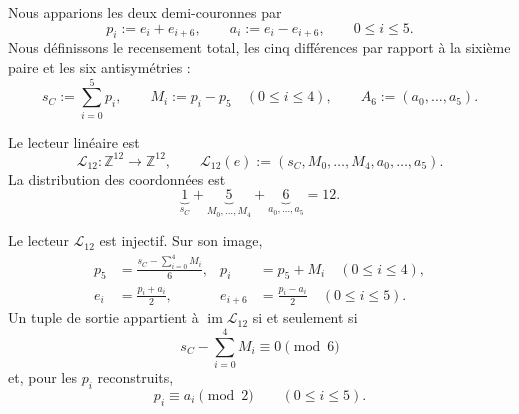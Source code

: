 Nous apparions les deux demi-couronnes par
\begin{equation}
 p_i:=e_i+e_{i+6},
 \qquad
 a_i:=e_i-e_{i+6},
 \qquad 0\leq i\leq5.
 \label{eq:u006d-pares-antipodales}
\end{equation}
Nous définissons le recensement total, les cinq différences par rapport à la sixième paire et
les six antisymétries :
\begin{equation}
 s_C:=\sum_{i=0}^{5}p_i,
 \qquad
 M_i:=p_i-p_5\quad(0\leq i\leq4),
 \qquad
 A_6:=(a_0,\ldots,a_5).
 \label{eq:u006d-coordenadas-uno-cinco-seis}
\end{equation}

\begin{definition}
\label{def:u006d-lector-integral}
Le lecteur linéaire est
\begin{equation}
 \mathcal L_{12}:\mathbb Z^{12}\longrightarrow\mathbb Z^{12},
 \qquad
 \mathcal L_{12}(e)
 :=
 (s_C,M_0,\ldots,M_4,a_0,\ldots,a_5).
 \label{eq:u006d-lector-l12}
\end{equation}
La distribution des coordonnées est
\begin{equation}
 \underbrace{1}_{s_C}
 +\underbrace{5}_{M_0,\ldots,M_4}
 +\underbrace{6}_{a_0,\ldots,a_5}
 =12.
 \label{eq:u006d-uno-cinco-seis}
\end{equation}
\end{definition}

\begin{theorem}
\label{thm:u006d-inversa-l12}
Le lecteur \(\mathcal L_{12}\) est injectif. Sur son image,
\begin{align}
 p_5&=
 \frac{s_C-\sum_{i=0}^{4}M_i}{6},
 &
 p_i&=p_5+M_i\quad(0\leq i\leq4),
 \label{eq:u006d-inversa-p}\\
 e_i&=\frac{p_i+a_i}{2},
 &
 e_{i+6}&=\frac{p_i-a_i}{2}
 \quad(0\leq i\leq5).
 \label{eq:u006d-inversa-e}
\end{align}
Un tuple de sortie appartient à \(\operatorname{im}\mathcal L_{12}\) si et
seulement si
\begin{equation}
 s_C-\sum_{i=0}^{4}M_i\equiv0\pmod6
 \label{eq:u006d-condicion-divisibilidad}
\end{equation}
et, pour les \(p_i\) reconstruits,
\begin{equation}
 p_i\equiv a_i\pmod2
 \qquad(0\leq i\leq5).
 \label{eq:u006d-condicion-paridad}
\end{equation}
\end{theorem}

